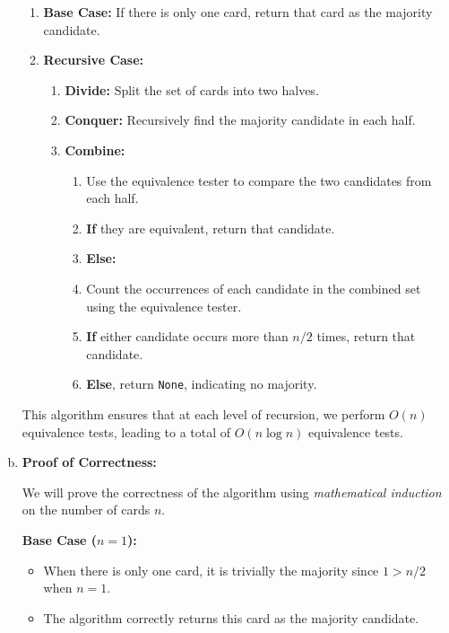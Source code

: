 \documentclass[10pt,letter,notitlepage]{article}
\begin{document}
\begin{Answer}
\begin{enumerate}[(a)]
    \begin{enumerate}
        \item \textbf{Base Case:} If there is only one card, return that card as the majority candidate.
        \item \textbf{Recursive Case:}
        \begin{enumerate}
            \item \textbf{Divide:} Split the set of cards into two halves.
            \item \textbf{Conquer:} Recursively find the majority candidate in each half.
            \item \textbf{Combine:}
            \begin{enumerate}
                \item Use the equivalence tester to compare the two candidates from each half.
                \item \textbf{If} they are equivalent, return that candidate.
                \item \textbf{Else:}
                    \item Count the occurrences of each candidate in the combined set using the equivalence tester.
                    \item \textbf{If} either candidate occurs more than $n/2$ times, return that candidate.
                    \item \textbf{Else}, return \texttt{None}, indicating no majority.
            \end{enumerate}
        \end{enumerate}
    \end{enumerate}

    This algorithm ensures that at each level of recursion, we perform $O(n)$ equivalence tests, leading to a total of $O(n \log n)$ equivalence tests.

    \item \textbf{Proof of Correctness:}

    We will prove the correctness of the algorithm using \textit{mathematical induction} on the number of cards $n$.

    \textbf{Base Case ($n = 1$):}

    \begin{itemize}
        \item When there is only one card, it is trivially the majority since $1 > n/2$ when $n = 1$.
        \item The algorithm correctly returns this card as the majority candidate.
    \end{itemize}


\end{enumerate}
\end{Answer}
\end{document}

